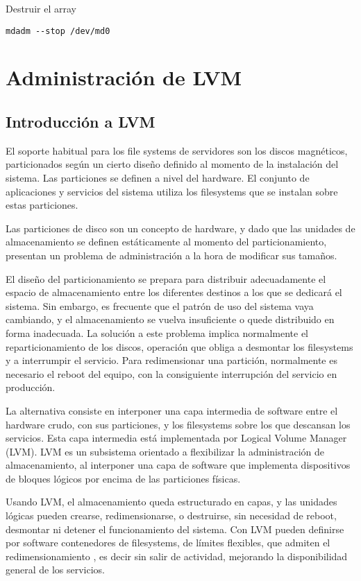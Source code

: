 Destruir el array
\begin{lstlisting}
mdadm --stop /dev/md0
\end{lstlisting}



\section{Administración de LVM}
\subsection{Introducción a  LVM}
\label{sub:introLVM}
El soporte habitual para los file systems de servidores son los discos magnéticos, particionados según un cierto diseño definido al momento de la instalación del sistema. Las particiones se definen a nivel del hardware. El conjunto de aplicaciones y servicios del sistema utiliza los filesystems que se instalan sobre estas particiones. 

Las particiones de disco son un concepto de hardware, y dado que las unidades de almacenamiento se definen estáticamente al momento del particionamiento, presentan un problema de administración a la hora de modificar sus tamaños. 


El diseño del particionamiento se prepara para distribuir adecuadamente el espacio de almacenamiento entre los diferentes destinos a los que se dedicará el sistema. Sin embargo, es frecuente que el patrón de uso del sistema vaya cambiando, y el almacenamiento se vuelva insuficiente o quede distribuido en forma inadecuada. La solución a este problema implica normalmente el reparticionamiento de los discos, operación que obliga a desmontar los filesystems y a interrumpir el servicio. Para redimensionar una partición, normalmente es necesario el reboot del equipo, con la consiguiente interrupción del servicio en producción. 


La alternativa consiste en interponer una capa intermedia de software entre el hardware crudo, con sus particiones, y los filesystems sobre los que descansan los servicios. Esta capa intermedia está implementada por Logical Volume Manager (LVM). LVM es un subsistema orientado a flexibilizar la administración de almacenamiento, al interponer una capa de software que implementa dispositivos de bloques lógicos por encima de las particiones físicas. 

Usando LVM, el almacenamiento queda estructurado en capas, y las unidades lógicas pueden crearse, redimensionarse, o destruirse, sin necesidad de reboot, desmontar ni detener el funcionamiento del sistema. Con LVM pueden definirse por software contenedores de filesystems, de límites flexibles, que admiten el redimensionamiento , es decir sin salir de actividad, mejorando la disponibilidad general de los servicios.

